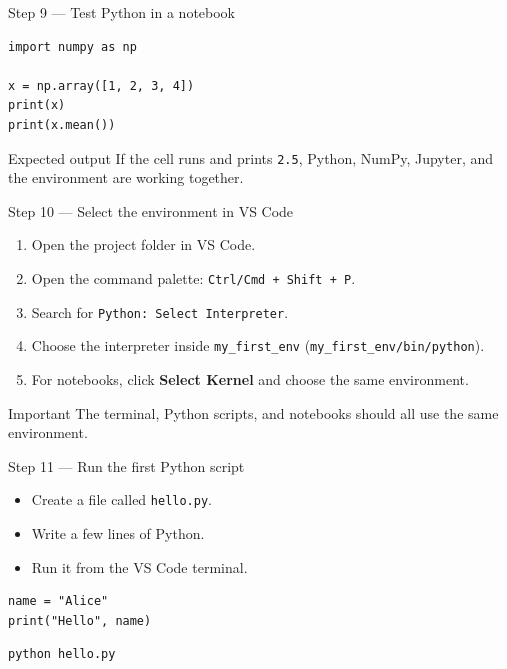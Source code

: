 \documentclass[aspectratio=169]{beamer}
\newcommand{\coursefooter}{}
\begin{document}
\begin{frame}[fragile]{Step 9 --- Test Python in a notebook}
\begin{lstlisting}[style=coursepython]
import numpy as np

x = np.array([1, 2, 3, 4])
print(x)
print(x.mean())
\end{lstlisting}
\begin{block}{Expected output}
If the cell runs and prints \texttt{2.5}, Python, NumPy, Jupyter, and the environment are working together.
\end{block}
\coursefooter
\end{frame}

\begin{frame}{Step 10 --- Select the environment in VS Code}
\begin{enumerate}
\item Open the project folder in VS Code.
\item Open the command palette: \texttt{Ctrl/Cmd + Shift + P}.
\item Search for \texttt{Python: Select Interpreter}.
\item Choose the interpreter inside \texttt{my\_first\_env} (\texttt{my\_first\_env/bin/python}).
\item For notebooks, click \textbf{Select Kernel} and choose the same environment.
\end{enumerate}
\begin{block}{Important}
The terminal, Python scripts, and notebooks should all use the same environment.
\end{block}
\coursefooter
\end{frame}

\begin{frame}[fragile]{Step 11 --- Run the first Python script}
\begin{itemize}
\item Create a file called \texttt{hello.py}.
\item Write a few lines of Python.
\item Run it from the VS Code terminal.
\end{itemize}
\begin{lstlisting}[style=coursepython]
name = "Alice"
print("Hello", name)
\end{lstlisting}
\begin{lstlisting}[style=coursebash]
python hello.py
\end{lstlisting}
\coursefooter
\end{frame}
\end{document}
